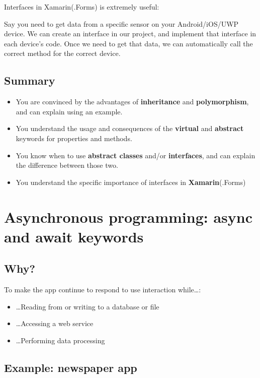 \documentclass{article}
\newcommand{\bold}[1]{\textbf{#1}}
\begin{document}
Interfaces in Xamarin(.Forms) is extremely useful: 

Say you need to get data from a specific sensor on your Android/iOS/UWP device. 
We can create an interface in our project, and implement that interface in each device's code.
Once we need to get that data, we can automatically call the correct method for the correct device.

\subsection{Summary}

\begin{itemize}
    \item You are convinced by the advantages of \bold{inheritance} and \bold{polymorphism}, and can explain using an example.
    \item You understand the usage and consequences of the \bold{virtual} and \bold{abstract} keywords for properties and methods.
    \item You know when to use \bold{abstract classes} and/or \bold{interfaces}, and can explain the difference between those two.
    \item You understand the specific importance of interfaces in \bold{Xamarin}(.Forms)
\end{itemize}

\section{Asynchronous programming: async and await keywords}

\subsection{Why?}

To make the app continue to respond to use interaction while\dots:
\begin{itemize}
    \item \dots Reading from or writing to a database or file
    \item \dots Accessing a web service
    \item \dots Performing data processing
\end{itemize}

\subsection{Example: newspaper app}
\end{document}
